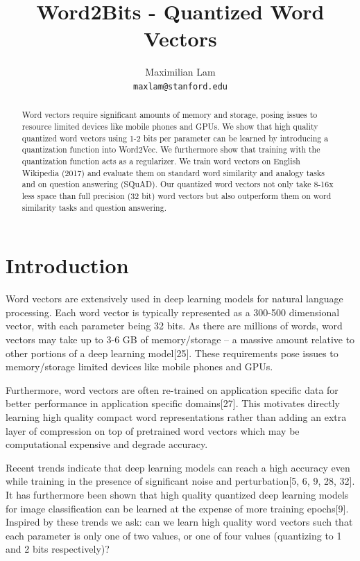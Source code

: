 \documentclass{article} %
\title{Word2Bits - Quantized Word Vectors}
\author{
Maximilian Lam\\
\texttt{maxlam@stanford.edu} \\
}
\begin{document}
\maketitle

\begin{abstract}
Word vectors require significant amounts of memory and storage, posing
issues to resource limited devices like mobile phones and GPUs. We
show that high quality quantized word vectors using 1-2 bits per
parameter can be learned by introducing a quantization function into
Word2Vec. We furthermore show that training with the quantization
function acts as a regularizer. We train word vectors on English
Wikipedia (2017) and evaluate them on standard word similarity and
analogy tasks and on question answering (SQuAD). Our quantized word
vectors not only take 8-16x less space than full precision (32 bit)
word vectors but also outperform them on word similarity tasks and
question answering.
\end{abstract}

\section{Introduction}
Word vectors are extensively used in deep learning models for natural
language processing. Each word vector is typically represented as a
300-500 dimensional vector, with each parameter being 32 bits. As
there are millions of words, word vectors may take up to 3-6 GB of
memory/storage -- a massive amount relative to other portions of a
deep learning model[25]. These requirements pose issues to
memory/storage limited devices like mobile phones and GPUs.

Furthermore, word vectors are often re-trained on application specific
data for better performance in application specific domains[27]. This
motivates directly learning high quality compact word representations
rather than adding an extra layer of compression on top of pretrained
word vectors which may be computational expensive and degrade
accuracy.

Recent trends indicate that deep learning models can reach a high
accuracy even while training in the presence of significant noise and
perturbation[5, 6, 9, 28, 32]. It has furthermore been shown that high quality
quantized deep learning models for image classification can be learned
at the expense of more training epochs[9]. Inspired by these trends we
ask: can we learn high quality word vectors such that each parameter
is only one of two values, or one of four values (quantizing to 1 and
2 bits respectively)?
\end{document}
